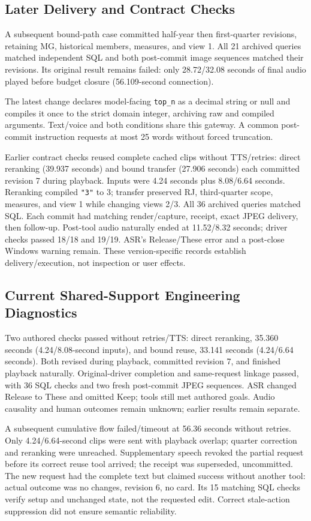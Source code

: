 \documentclass[conference,10pt,letterpaper]{IEEEtran}
\begin{document}
\subsection{Later Delivery and Contract Checks}
A subsequent bound-path case committed half-year then first-quarter revisions, retaining MG, historical members, measures, and view 1. All 21 archived queries matched independent SQL and both post-commit image sequences matched their revisions. Its original result remains failed: only 28.72/32.08 seconds of final audio played before budget closure (56.109-second connection).

The latest change declares model-facing \texttt{top\_n} as a decimal string or null and compiles it once to the strict domain integer, archiving raw and compiled arguments. Text/voice and both conditions share this gateway. A common post-commit instruction requests at most 25 words without forced truncation.

Earlier contract checks reused complete cached clips without TTS/retries: direct reranking (39.937 seconds) and bound transfer (27.906 seconds) each committed revision 7 during playback. Inputs were 4.24 seconds plus 8.08/6.64 seconds. Reranking compiled \texttt{"3"} to 3; transfer preserved RJ, third-quarter scope, measures, and view 1 while changing views 2/3. All 36 archived queries matched SQL. Each commit had matching render/capture, receipt, exact JPEG delivery, then follow-up. Post-tool audio naturally ended at 11.52/8.32 seconds; driver checks passed 18/18 and 19/19. ASR's Release/These error and a post-close Windows warning remain. These version-specific records establish delivery/execution, not inspection or user effects.

\subsection{Current Shared-Support Engineering Diagnostics}
Two authored checks passed without retries/TTS: direct reranking, 35.360 seconds (4.24/8.08-second inputs), and bound reuse, 33.141 seconds (4.24/6.64 seconds). Both revised during playback, committed revision 7, and finished playback naturally. Original-driver completion and same-request linkage passed, with 36 SQL checks and two fresh post-commit JPEG sequences. ASR changed Release to These and omitted Keep; tools still met authored goals. Audio causality and human outcomes remain unknown; earlier results remain separate.

A subsequent cumulative flow failed/timeout at 56.36 seconds without retries. Only 4.24/6.64-second clips were sent with playback overlap; quarter correction and reranking were unreached. Supplementary speech revoked the partial request before its correct reuse tool arrived; the receipt was superseded, uncommitted. The new request had the complete text but claimed success without another tool: actual outcome was no changes, revision 6, no card. Its 15 matching SQL checks verify setup and unchanged state, not the requested edit. Correct stale-action suppression did not ensure semantic reliability.
\end{document}
